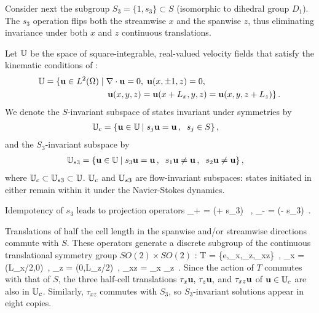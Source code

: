 Consider next the subgroup $S_3 = \{1,s_3\} \subset S$ (isomorphic to
dihedral group $D_1$). The $s_3$ operation flips both the streamwise
$x$ and the spanwise $z$, thus eliminating invariance under both $x$
and $z$ continuous translations. 


Let $\mathbb{U}$ be the space of square-integrable, real-valued velocity
fields that satisfy the kinematic conditions of \pCf:
\begin{align}
 \bbU  &= \{\bu \in L^2(\bCell) \; | \; \grad \cdot \bu = 0,
               \; \bu(x, \pm 1, z) = 0, \notag \\
         &\phantom{=} {} \qquad \qquad \qquad \; \; %
          \bu(x, y, z) = \bu(x+L_x, y, z) = \bu(x, y, z + L_z)\}
\,.
\end{align}
We denote the $S$-invariant subspace of states invariant under
symmetries  by
\begin{align}
\mathbb{U}_{c}  &= \{{\bf u} \in \mathbb{U}  \: | \;
              s_j {\bf u} = {\bf u}\,, \;\;  s_j \in S \}
\,,
\label{symmSubspU}
\end{align}
and the $S_3$-invariant subspace by
\begin{align}
\bbUthree  &= \{\bu \in \bbU  \: | \;
              s_3 \bu = \bu\,, \;\; %
              s_1 \bu \neq \bu\,, \;\;  s_2 \bu \neq \bu
               \}
\,,
\label{symmUthree}
\end{align}
where $ \mathbb{U}_{c} \subset \mathbb{U}_{s3} \subset \mathbb{U}$.
%
$\mathbb{U}_{c}$ and  $\mathbb{U}_{s3}$ are flow-invariant subspaces: states initiated
in either remain within it under the Navier-Stokes dynamics.

Idempotency of $s_3$ leads to projection operators
\beq
{\PP}_+ =
    (\matId + s_3) \, ,\qquad
{\PP}_- =
    (\matId - s_3) \,.

Translations of half the cell length in the spanwise and/or streamwise
directions commute with $S$. These operators generate a discrete
subgroup of the continuous translational symmetry group $SO(2) \times
SO(2)$ :
\beq
T = \{e,\tau_x,\tau_z,\tau_{xz}\}
    \,,\qquad
    \tau_x = \tau(L_x/2,0)
    \,,\;
    \tau_z = \tau(0,L_z/2)
    \,,\;
    \tau_{xz} = \tau_x \tau_z
\,.
Since the action of $T$ commutes with that of $S$,
the three half-cell translations $\tau_x {\bf u}, \, \tau_z {\bf u},$ and
$\tau_{xz} {\bf u}$ of ${\bf u} \in \mathbb{U}_{c}$ are also in $\mathbb{U}_{c}$.
Similarly, $\tau_{xz}$ commutes with $S_3$, so $S_3$-invariant
solutions appear in eight copies.




